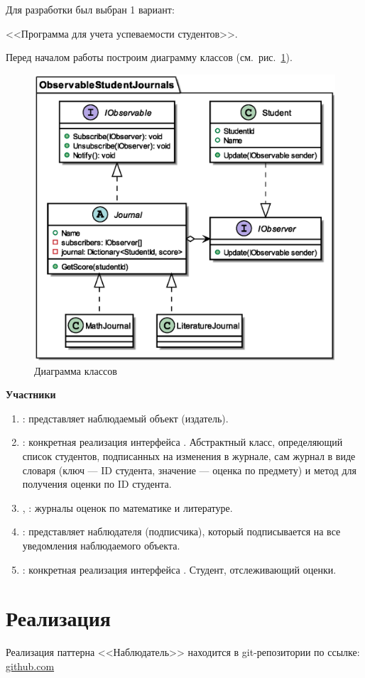 \documentclass[PI,LAB]{HSEUniversity}
\begin{document}
Для разработки был выбран 1 вариант:

<<Программа для учета успеваемости студентов>>.

Перед началом работы построим диаграмму классов (см.~рис.~\ref{fig:Task_CD}).

\begin{figure}[h]
  \centering
  \includegraphics[scale=0.75]{Task_CD.eps}
  \caption{Диаграмма классов}
  \label{fig:Task_CD}
\end{figure}

\textbf{Участники}

\begin{enumerate}
  \item {}: представляет наблюдаемый объект (издатель). 
  \item {}: конкретная реализация интерфейса . Абстрактный класс, определяющий список студентов, подписанных на изменения в журнале, сам журнал в виде словаря (ключ --- ID студента, значение --- оценка по предмету) и метод  для получения оценки по ID студента.
  \item {}, : журналы оценок по математике и литературе.
  \item {}: представляет наблюдателя (подписчика), который подписывается на все уведомления наблюдаемого объекта.
  \item {}: конкретная реализация интерфейса . Студент, отслеживающий оценки.
\end{enumerate}

\section{Реализация}
Реализация паттерна <<Наблюдатель>> находится в git-репозитории по ссылке: \href{https://github.com/rovany706/design-patterns/tree/master/Observer/ObservableStudentJournals}{github.com}
\end{document}
